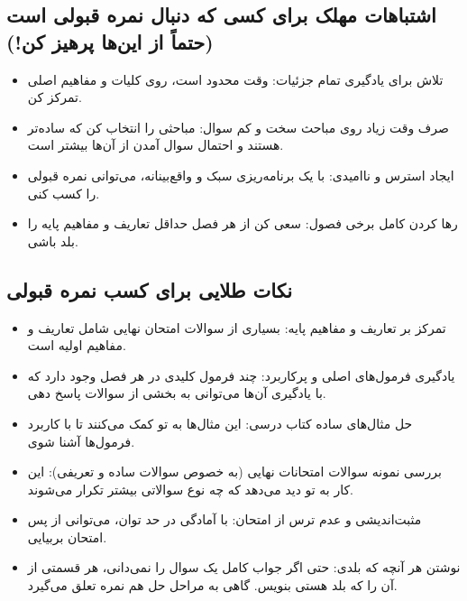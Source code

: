 \documentclass[12pt]{article}
\newcommand{\休息}[1]{\par\centering\textit{#1}\par\vspace{1ex}} %
\begin{document}
\subsection*{اشتباهات مهلک برای کسی که دنبال نمره قبولی است (حتماً از این‌ها پرهیز کن!)}
\begin{itemize}
    \item تلاش برای یادگیری تمام جزئیات: وقت محدود است، روی کلیات و مفاهیم اصلی تمرکز کن.
    \item صرف وقت زیاد روی مباحث سخت و کم سوال: مباحثی را انتخاب کن که ساده‌تر هستند و احتمال سوال آمدن از آن‌ها بیشتر است.
    \item ایجاد استرس و ناامیدی: با یک برنامه‌ریزی سبک و واقع‌بینانه، می‌توانی نمره قبولی را کسب کنی.
    \item رها کردن کامل برخی فصول: سعی کن از هر فصل حداقل تعاریف و مفاهیم پایه را بلد باشی.
\end{itemize}

\subsection*{نکات طلایی برای کسب نمره قبولی}
\begin{itemize}
    \item تمرکز بر تعاریف و مفاهیم پایه: بسیاری از سوالات امتحان نهایی شامل تعاریف و مفاهیم اولیه است.
    \item یادگیری فرمول‌های اصلی و پرکاربرد: چند فرمول کلیدی در هر فصل وجود دارد که با یادگیری آن‌ها می‌توانی به بخشی از سوالات پاسخ دهی.
    \item حل مثال‌های ساده کتاب درسی: این مثال‌ها به تو کمک می‌کنند تا با کاربرد فرمول‌ها آشنا شوی.
    \item بررسی نمونه سوالات امتحانات نهایی (به خصوص سوالات ساده و تعریفی): این کار به تو دید می‌دهد که چه نوع سوالاتی بیشتر تکرار می‌شوند.
    \item مثبت‌اندیشی و عدم ترس از امتحان: با آمادگی در حد توان، می‌توانی از پس امتحان بربیایی.
    \item نوشتن هر آنچه که بلدی: حتی اگر جواب کامل یک سوال را نمی‌دانی، هر قسمتی از آن را که بلد هستی بنویس. گاهی به مراحل حل هم نمره تعلق می‌گیرد.
\end{itemize}
\end{document}
